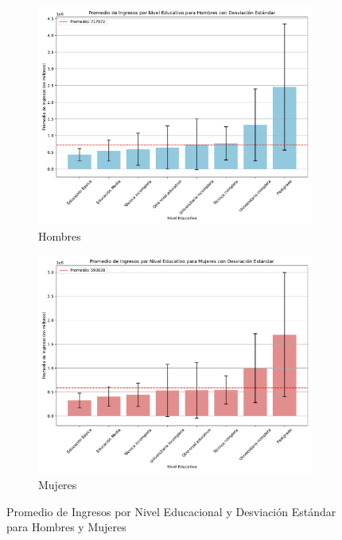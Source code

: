 \documentclass{article}
\begin{document}
	\FloatBarrier
	
	\begin{figure}[htbp]
		\centering
		\begin{subfigure}[b]{0.49\textwidth}
			\centering
			\includegraphics[width=1\textwidth]{../output/fig/PromIngH_EducaDE.pdf}
			\caption{\label{6a} Hombres}
		\end{subfigure}
		\hfill
		\begin{subfigure}[b]{0.49\textwidth}
			\centering
			\includegraphics[width=1\textwidth]{../output/fig/PromIngM_EducaDE.pdf}
			\caption{\label{6b} Mujeres}
		\end{subfigure}
		\caption{Promedio de Ingresos por Nivel Educacional y Desviación Estándar para Hombres y Mujeres}
		\label{06fig}
	\end{figure}
	
\end{document}

